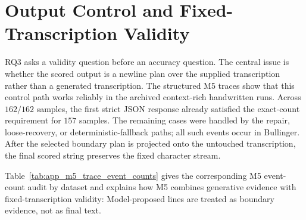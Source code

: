 \section{Output Control and Fixed-Transcription Validity}
\label{sec:experimentation_output_control_audit}

RQ3 asks a validity question before an accuracy question. The central issue is whether the scored output is a newline plan over the supplied transcription rather than a generated transcription. The structured M5 traces show that this control path works reliably in the archived context-rich handwritten runs. Across \(162/162\) samples, the first strict JSON response already satisfied the exact-count requirement for \(157\) samples. The remaining cases were handled by the repair, loose-recovery, or deterministic-fallback paths; all such events occur in Bullinger. After the selected boundary plan is projected onto the untouched transcription, the final scored string preserves the fixed character stream.

Table~\ref{tab:app_m5_trace_event_counts} gives the corresponding M5 event-count audit by dataset and explains how M5 combines generative evidence with fixed-transcription validity: Model-proposed lines are treated as boundary evidence, not as final text.

